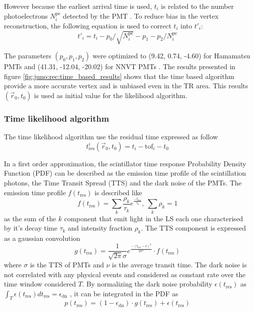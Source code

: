 However because the earliest arrival time is used, $t_i$ is related to the number photoelectrons $N_i^{\mathrm{pe}}$ detected by the PMT \cite{ranucci_analytical_1995, galbiati_time_2006, moszynski_status_1979}. To reduce bias in the vertex reconstruction, the following equation is used to correct $t_i$ into $t'_i$:
\begin{equation}
  t'_{i} = t_i - p_0 / \sqrt{N_i^{\mathrm{pe}}} - p_1 - p_2 / N_i^{\mathrm{pe}}
\end{equation}

The parameters $(p_0, p_1, p_2)$ were optimized to (9.42, 0.74, -4.60) for Hamamatsu PMTs and (41.31, -12.04, -20.02) for NNVT PMTs \cite{li_event_2021}. The results presented in figure \ref{fig:juno:rec:time_based_results} shows that the time based algorithm provide a more accurate vertex and is unbiased even in the TR area. This results $(\vec{r}_0, t_0)$ is used as initial value for the likelihood algorithm.

\subsubsection{Time likelihood algorithm}

The time likelihood algorithm use the residual time expressed as follow
\begin{equation}
  \label{eq:juno:rec:t_res}
  t_{\mathrm{res}}^i(\vec{r}_0, t_0) = t_i - \mathrm{tof}_i - t_0
\end{equation}

In a first order approximation, the scintillator time response Probability Density Function (PDF) can be described as the emission time profile of the scintillation photons, the Time Transit Spread (TTS) and the dark noise of the PMTs. The emission time profile $f(t_{\mathrm{res}})$ is described like
\begin{equation}
  f(t_{\mathrm{res}}) = \sum_k \frac{\rho_k}{\tau_k} e^{\frac{-t_{\mathrm{res}}}{\tau_k}}, ~ \sum_k \rho_k = 1
\end{equation}
as the sum of the $k$ component that emit light in the LS each one characterised by it's decay time $\tau_k$ and intensity fraction $\rho_k$. The TTS component is expressed as a gaussian convolution
\begin{equation}
  g(t_{\mathrm{res}}) = \frac{1}{\sqrt{2\pi}\sigma}e^{\frac{-(t_{\mathrm{res}} - \nu)^2}{2\sigma^2}} \cdot f(t_{\mathrm{res}})
\end{equation}
where $\sigma$ is the TTS of PMTs and $\nu$ is the average transit time. The dark noise is not correlated with any physical events and considered as constant rate over the time window considered $T$. By normalizing the dark noise probability $\epsilon(t_{\mathrm{res}})$ as $\int_T \epsilon(t_{\mathrm{res}}) dt_{\mathrm{res}} = \epsilon_{\mathrm{dn}}$ , it can be integrated in the PDF as
\begin{equation}
  \label{eq:juno:juno:tim_like:dn}
  p(t_{\mathrm{res}}) = (1-\epsilon_{\mathrm{dn}}) \cdot g(t_{\mathrm{res}}) + \epsilon(t_{\mathrm{res}})
\end{equation}


